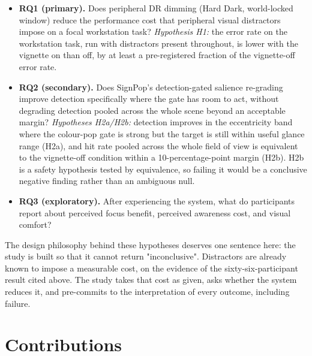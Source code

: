 \begin{itemize}
\item \textbf{RQ1 (primary).} Does peripheral DR dimming (Hard Dark, world-locked window) reduce the
  performance cost that peripheral visual distractors impose on a focal workstation task?
  \textit{Hypothesis H1:} the error rate on the workstation task, run with distractors present
  throughout, is lower with the vignette on than off, by at least a pre-registered fraction of the
  vignette-off error rate.
\item \textbf{RQ2 (secondary).} Does SignPop's detection-gated salience re-grading improve detection
  specifically where the gate has room to act, without degrading detection pooled across the whole
  scene beyond an acceptable margin?
  \textit{Hypotheses H2a/H2b:} detection improves in the eccentricity band where the colour-pop gate is
  strong but the target is still within useful glance range (H2a), and hit rate pooled across the
  whole field of view is equivalent to the vignette-off condition within a 10-percentage-point margin
  (H2b). H2b is a safety hypothesis tested by equivalence, so failing it would be a conclusive
  negative finding rather than an ambiguous null.
\item \textbf{RQ3 (exploratory).} After experiencing the system, what do participants report about
  perceived focus benefit, perceived awareness cost, and visual comfort?
\end{itemize}

The design philosophy behind these hypotheses deserves one sentence here: the study is built so that
it cannot return "inconclusive". Distractors are already known to impose a measurable cost, on the
evidence of the sixty-six-participant result cited above. The study takes that cost as given, asks
whether the system reduces it, and pre-commits to the interpretation of every outcome, including
failure.

\section{Contributions}

